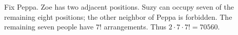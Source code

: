 Fix Peppa. Zoe has two adjacent positions. Suzy can occupy seven of the remaining eight positions; the other neighbor of Peppa is forbidden. The remaining seven people have $7!$ arrangements. Thus $2\cdot7\cdot7!=\boxed{70560}$.
